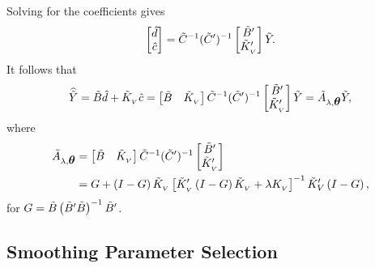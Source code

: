 Solving for the coefficients gives
\begin{equation} \label{eq:d-c-hat}
\begin{bmatrix} \hat{d} \\ \hat{c} \end{bmatrix} = \tilde{C}^{-1} (\tilde{C}')^{-1} \begin{bmatrix} \tilde{B}' \\ \tilde{K}_{_{\scriptscriptstyle V}}' \end{bmatrix} \tilde{Y}. 
\end{equation} 
\noindent
It follows that
\begin{equation} \label{eq:tildeY-hat-equals-tildeA-tildeY}
\widehat{\tilde{Y}} = \tilde{B} \hat{d} + \tilde{K}_{_{\scriptscriptstyle V}} \hat{c} = \begin{bmatrix} \tilde{B} & \tilde{K}_{_{\scriptscriptstyle V}} \end{bmatrix} \tilde{C}^{-1} (\tilde{C}')^{-1} \begin{bmatrix} \tilde{B}' \\ \tilde{K}_{_{\scriptscriptstyle V}}' \end{bmatrix} \tilde{Y} = \tilde{A}_{\lambda,\mbox{\boldmath $\theta$}} \tilde{Y},
\end{equation} 
\noindent
where
\begin{align}
\begin{split} \label{eq:smoothing-matrix-A-tilde}
\tilde{A}_{\lambda,\mbox{\boldmath $\theta$}} &= \begin{bmatrix} \tilde{B} & \tilde{K}_{_{\scriptscriptstyle V}} \end{bmatrix} \tilde{C}^{-1} (\tilde{C}')^{-1} \begin{bmatrix} \tilde{B}' \\ \tilde{K}_{_{\scriptscriptstyle V}}' \end{bmatrix}  \\
&= G + \left(I - G\right) \tilde{K}_{_{\scriptscriptstyle V}} \left[\tilde{K}_{_{\scriptscriptstyle V}}'\left( I - G \right)\tilde{K}_{_{\scriptscriptstyle V}} + \lambda K_{_{\scriptscriptstyle V}}\right]^{-1} \tilde{K}'_V\left(I - G\right),
\end{split}
\end{align} 
\noindent
for $G = \tilde{B}\left(\tilde{B}' \tilde{B} \right)^{-1}\tilde{B}'$.





\subsection{Smoothing Parameter Selection} \label{gaussian-unbiased-risk-estimate}

